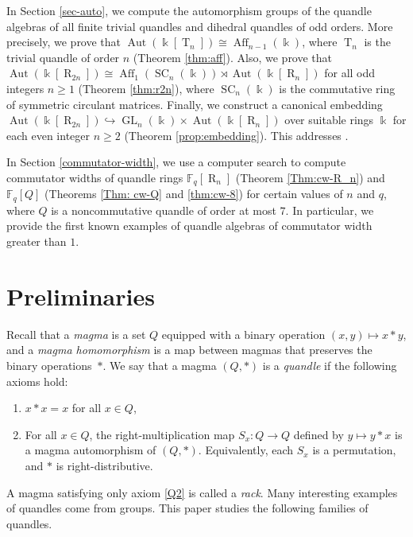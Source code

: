 \documentclass[12 pt]{amsart}
\theoremstyle{definition}
\theoremstyle{remark}
\numberwithin{equation}{section}
\newcommand{\Aut}{\operatorname{Aut}}
\newcommand{\T}{\operatorname{T}}
\newcommand{\R}{\operatorname{R}}
\newcommand{\GL}{\operatorname{GL}}
\newcommand{\Aff}{\operatorname{Aff}}
\newcommand{\SC}{\operatorname{SC}}
\renewcommand{\k}{\Bbbk}
\newcommand{\F}{\mathbb F}
\begin{document}
In Section \ref{sec-auto}, we compute the automorphism groups of the quandle algebras of all finite trivial quandles and dihedral quandles of odd orders. More precisely, we prove that $\Aut(\k[\T_{n}])\cong\Aff_{n-1}(\k)$, where $\T_n$ is
the trivial quandle of order $n$ (Theorem \ref{thm:aff}). Also, we prove that $\Aut(\k[\R_{2n}])\cong \Aff_1(\SC_n(\k))\rtimes \Aut(\k[\R_n])$ for all odd integers $n\geq 1$ (Theorem \ref{thm:r2n}), where $\SC_n(\k)$ is the commutative ring of symmetric circulant matrices. Finally, we construct a canonical embedding
$\Aut(\k[\R_{2n}])\hookrightarrow\GL_n(\k)\times\Aut(\k[\R_n])$ over suitable rings $\k$ for each even integer $n\geq 2$ (Theorem \ref{prop:embedding}). This addresses \cite[Prob.\ 6.5]{BPS-1}.


In Section \ref{commutator-width}, we use a computer search to compute commutator widths of quandle rings $\F_q[\R_n]$ (Theorem \ref{Thm:cw-R_n}) and $\F_q[Q]$ (Theorems \ref{Thm: cw-Q} and \ref{thm:cw-8}) for certain values of $n$ and $q$, where $Q$ is a noncommutative quandle of order at most $7$. In particular, we provide the first known examples of quandle algebras of commutator width greater than $1$.

 
\section{Preliminaries}\label{sec-prelim}
 Recall that a {\it magma} is a set $Q$ equipped with a binary operation $(x,y) \mapsto x * y$, and a \emph{magma homomorphism} is a map between magmas that preserves the binary operations~$*$. We say that a magma $(Q,*)$ is a \emph{quandle} if the following axioms hold:
\begin{enumerate}[(Q1)]
\item $x*x=x$ for all $x \in Q$,
\item\label{Q2} For all $x \in Q$, the right-multiplication map $S_x\colon Q \to Q$ defined by $y \mapsto y\ast x$ is a magma automorphism of $(Q,\ast)$. Equivalently, each $S_x$ is a permutation, and $*$ is right-distributive.
\end{enumerate}

A magma satisfying only axiom \ref{Q2} is called a {\it rack}. Many interesting examples of quandles come from groups. This paper studies the following families of quandles.
\par
\end{document}
